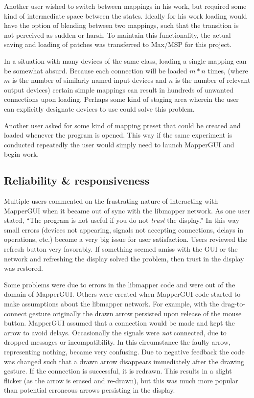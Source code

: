 Another user wished to switch between mappings in his work, but required some kind of intermediate space between the states. Ideally for his work loading would have the option of blending between two mappings, such that the transition is not perceived as sudden or harsh. To maintain this functionality, the actual saving and loading of patches was transferred to Max/MSP for this project.

In a situation with many devices of the same class, loading a single mapping can be somewhat absurd. Because each connection will be loaded $m*n$ times, (where $m$ is the number of similarly named input devices and $n$ is the number of relevant output devices) certain simple mappings can result in hundreds of unwanted connections upon loading. Perhaps some kind of staging area wherein the user can explicitly designate devices to use could solve this problem.

Another user asked for some kind of mapping preset that could be created and loaded whenever the program is opened. This way if the same experiment is conducted repeatedly the user would simply need to launch MapperGUI and begin work.
	

	\subsection{Reliability \& responsiveness} %
	\label{sub:reliability_and_responsiveness}

Multiple users commented on the frustrating nature of interacting with MapperGUI when it became out of sync with the libmapper network. As one user stated, ``The program is not useful if you do not \emph{trust} the display.'' In this way small errors (devices not appearing, signals not accepting connections, delays in operations, etc.) become a very big issue for user satisfaction. Users reviewed the refresh button very favorably. If something seemed amiss with the GUI or the network and refreshing the display solved the problem, then trust in the display was restored.

Some problems were due to errors in the libmapper code and were out of the domain of MapperGUI. Others were created when MapperGUI code started to make assumptions about the libmapper network. For example, with the drag-to-connect gesture originally the drawn arrow persisted upon release of the mouse button. MapperGUI assumed that a connection would be made and kept the arrow to avoid delays. Occasionally the signals were \emph{not} connected, due to dropped messages or incompatibility. In this circumstance the faulty arrow, representing nothing, became very confusing. Due to negative feedback the code was changed such that a drawn arrow disappears immediately after the drawing gesture. If the connection is successful, it is redrawn. This results in a slight flicker (as the arrow is erased and re-drawn), but this was much more popular than potential erroneous arrows persisting in the display.

